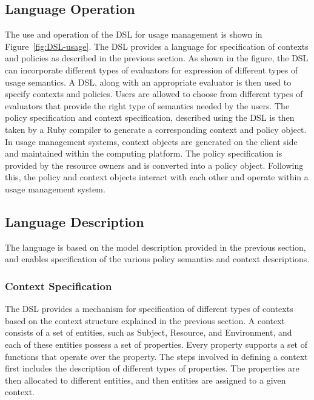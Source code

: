 \subsection{Language Operation}
The use and operation of the DSL for usage management is shown in Figure~\ref{fig:DSL-usage}. The DSL provides a language for specification of contexts and policies as described in the previous section. As shown in the figure, the DSL can incorporate different types of evaluators for expression of different types of usage semantics. A DSL, along with an appropriate evaluator is then used to specify contexts and policies. Users are allowed to choose from different types of evaluators that provide the right type of semantics needed by the users. The policy specification and context specification, described using the DSL is then taken by a Ruby compiler to generate a corresponding context and policy object. In usage management systems, context objects are generated on the client side and maintained within the computing platform. The policy specification is provided by the resource owners and is converted into a policy object. Following this, the policy and context objects interact with each other and operate within a usage management system.  

\subsection{Language Description}
The language is based on the model description provided in the previous section, and enables specification of the various policy semantics and context descriptions. 

\subsubsection{Context Specification}
The DSL provides a mechanism for specification of different types of contexts based on the context structure explained in the previous section. A context consists of a set of entities, such as Subject, Resource, and Environment, and each of these entities possess a set of properties. Every property supports a set of functions that operate over the property. The steps involved in defining a context first includes the description of different types of properties. The properties are then allocated to different entities, and then entities are assigned to a given context. 

